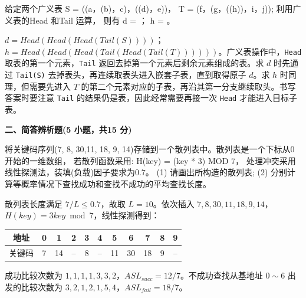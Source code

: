 \begin{question}
给定两个广义表 S = ((a，(b)，c)，((d)，e))， T = (f，(g，((h))，i，j)); 利用广义表的Head 和Tail 运算， 则有
d = \blank；
h = \blank。

\begin{solution}
$d=Head(Head(Head(Tail(S))))$；$h=Head(Head(Head(Tail(Head(Tail(T))))))$。广义表操作中，\texttt{Head} 取表的第一个元素，\texttt{Tail} 返回去掉第一个元素后剩余元素组成的表。求 $d$ 时先通过 \texttt{Tail(S)} 去掉表头，再连续取表头进入嵌套子表，直到取得原子 $d$。求 $h$ 时同理，但需要先进入 $T$ 的第二个元素对应的子表，再沿其第一分支继续取头。书写答案时要注意 \texttt{Tail} 的结果仍是表，因此经常需要再接一次 \texttt{Head} 才能进入目标子表。
\end{solution}
\end{question}

\textbf{二、简答辨析题(5 小题，共15 分)}
\begin{question}[2 分]
将关键码序列(7, 8, 30,11, 18, 9, 14)存储到一个散列表中。散列表是一个下标从0 开始的一维数组， 若散列函数采用: H(key) = (key * 3) MOD 7， 处理冲突采用线性探测法，装填(负载)因子要求为0.7。
(1) 请画出所构造的散列表;
(2) 分别计算等概率情况下查找成功和查找不成功的平均查找长度。

\begin{solution}
散列表长度满足 $7/L\le0.7$，故取 $L=10$。依次插入 $7,8,30,11,18,9,14$，$H(key)=3key\bmod7$，线性探测得到：
  \begin{center}
  \begin{tabular}{c|cccccccccc}
  地址&0&1&2&3&4&5&6&7&8&9\\ \hline
  关键码&7&14&--&8&--&11&30&18&9&--
  \end{tabular}
  \end{center}
  成功比较次数为 $1,1,1,1,3,3,2$，$ASL_{succ}=12/7$。不成功查找从基地址 $0\sim6$ 出发的比较次数为 $3,2,1,2,1,5,4$，$ASL_{fail}=18/7$。
\end{solution}
\end{question}

